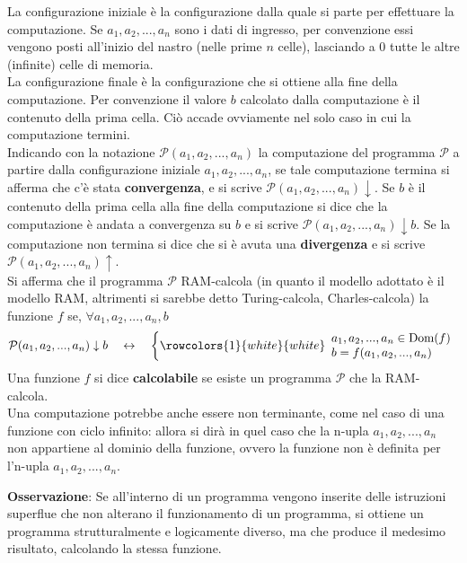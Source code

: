 \documentclass[a4paper]{extarticle}
\begin{document}
La configurazione iniziale è la configurazione dalla quale si parte per effettuare la computazione. Se \(a_1, a_2, ..., a_n\) sono i dati di ingresso, per convenzione essi vengono posti all'inizio del nastro (nelle prime \(n\) celle), lasciando a \(0\) tutte le altre (infinite) celle di memoria.\\
La configurazione finale è la configurazione che si ottiene alla fine della computazione. Per convenzione il valore \(b\) calcolato dalla computazione è il contenuto della prima cella. Ciò accade ovviamente nel solo caso in cui la computazione termini.\\
Indicando con la notazione \(\mathcal{P} (a_1, a_2, ..., a_n)\) la computazione del programma \(\mathcal{P}\) a partire dalla configurazione iniziale \(a_1, a_2, ..., a_n\), se tale computazione termina si afferma che c'è stata \textbf{convergenza}, e si scrive \(\mathcal{P}(a_1, a_2, ..., a_n) \downarrow\). Se \(b\) è il contenuto della prima cella alla fine della computazione si dice che la computazione è andata a convergenza su \(b\) e si scrive \(\mathcal{P}(a_1, a_2, ..., a_n) \downarrow b\). Se la computazione non termina si dice che si è avuta una \textbf{divergenza} e si scrive \(\mathcal{P}(a_1, a_2, ..., a_n) \uparrow\).\\
Si afferma che il programma \(\mathcal{P}\) RAM-calcola (in quanto il modello adottato è il modello RAM, altrimenti si sarebbe detto Turing-calcola, Charles-calcola) la funzione \(f\) se, \(\forall a_1, a_2, ..., a_n, b\)
\[\mathcal{P}(a_1, a_2, ..., a_n) \downarrow b \hspace{1em} \leftrightarrow \hspace{1em}
    \left\{
        \rowcolors{1}{white}{white}
        \begin{array}{l}
             a_1, a_2, ..., a_n \in \text{Dom}(f)\\
             b = f(a_1, a_2, ..., a_n)
        \end{array}
    \right.
\]
Una funzione \(f\) si dice \textbf{calcolabile} se esiste un programma \(\mathcal{P}\) che la RAM-calcola.\\
Una computazione potrebbe anche essere non terminante, come nel caso di una funzione con ciclo infinito: allora si dirà in quel caso che la n-upla \(a_1, a_2, ..., a_n\) non appartiene al dominio della funzione, ovvero la funzione non è definita per l'n-upla \(a_1, a_2, ..., a_n\).

\vspace{1em}
\noindent
\textbf{Osservazione}: Se all'interno di un programma vengono inserite delle istruzioni superflue che non alterano il funzionamento di un programma, si ottiene un programma strutturalmente e logicamente diverso, ma che produce il medesimo risultato, calcolando la stessa funzione.
\end{document}
